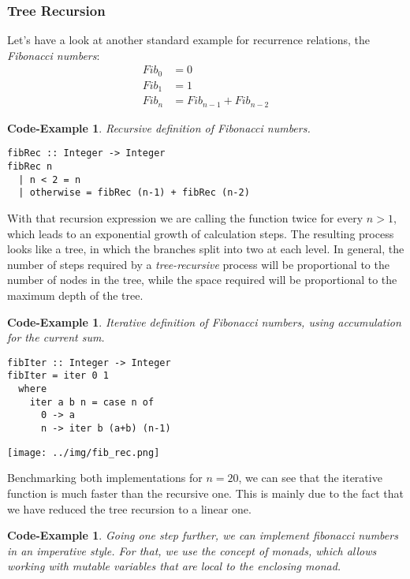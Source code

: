 \documentclass{scrartcl}
\newtheorem{impl}[defn]{Code-Example}
\numberwithin{equation}{section}
\begin{document}
\subsubsection{Tree Recursion}

Let's have a look at another standard example for recurrence relations, the \emph{Fibonacci numbers}:
\begin{align*}
    Fib_0 &= 0 \\ Fib_1 &= 1 \\ Fib_n &= Fib_{n-1} + Fib_{n-2}
\end{align*}

\begin{impl}
Recursive definition of Fibonacci numbers.
\end{impl}

\begin{verbatim}
fibRec :: Integer -> Integer
fibRec n
  | n < 2 = n
  | otherwise = fibRec (n-1) + fibRec (n-2)
\end{verbatim}

With that recursion expression we are calling the function twice for every $n>1$, which leads to an exponential growth of calculation steps.
The resulting process looks like a tree, in which the branches split into two at each level.
In general, the number of steps required by a \emph{tree-recursive} process will be proportional to the number of nodes in the tree, while the space required will be proportional to the maximum depth of the tree.

\begin{impl}
Iterative definition of Fibonacci numbers, using accumulation for the current sum.
\end{impl}

\begin{verbatim}
fibIter :: Integer -> Integer
fibIter = iter 0 1
  where
    iter a b n = case n of
      0 -> a
      n -> iter b (a+b) (n-1)
\end{verbatim}

\texttt{[image: ../img/fib\_rec.png]}

Benchmarking both implementations for $n=20$, we can see that the iterative function is much faster than the recursive one. This is mainly due to the fact that we have reduced the tree recursion to a linear one.

\begin{impl}
Going one step further, we can implement fibonacci numbers in an imperative style. For that, we use the concept of monads, which allows working with mutable variables that are local to the enclosing monad.
\end{impl}
\end{document}
